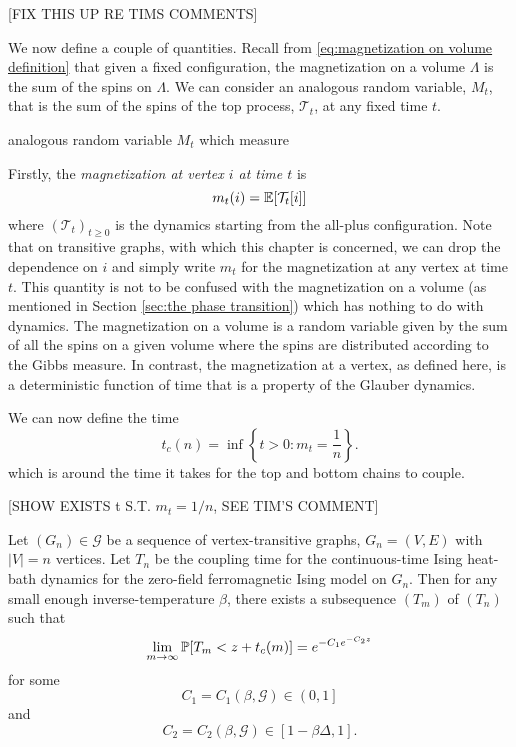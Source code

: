 [FIX THIS UP RE TIMS COMMENTS]

We now define a couple of quantities. Recall from \eqref{eq:magnetization on volume definition} that given a fixed configuration, the magnetization on a volume $\Lambda$ is the sum of the spins on $\Lambda$. We can consider an analogous random variable, $M_t$, that is the sum of the spins of the top process, $\mathcal{T}_t$, at any fixed time $t$. 

analogous random variable $M_t$ which measure

Firstly, the \emph{magnetization at vertex $i$ at time $t$} is
\begin{equation}
	 	m_t(i) = \mathbb{E}[\mathcal{T}_t[i]]
\end{equation} 
where $(\mathcal{T}_t)_{t \geq 0}$ is the dynamics starting from the all-plus configuration. Note that on transitive graphs, with which this chapter is concerned, we can drop the dependence on $i$ and simply write $m_t$ for the magnetization at any vertex at time $t$. This quantity is not to be confused with the magnetization on a volume (as mentioned in Section \ref{sec:the phase transition}) which has nothing to do with dynamics. The magnetization on a volume is a random variable given by the sum of all the spins on a given volume where the spins are distributed according to the Gibbs measure. In contrast, the magnetization at a vertex, as defined here, is a deterministic function of time that is a property of the Glauber dynamics.

We can now define the time
\begin{equation}
	\label{eq:definition t_c(n)}
	t_c(n) = \inf\left\{ t > 0 : m_t = \frac{1}{n}\right\}.
\end{equation}
which is around the time it takes for the top and bottom chains to couple.

[SHOW EXISTS t S.T. $m_t = 1/n$, SEE TIM'S COMMENT]

\begin{theorem}
\label{thm:Coupling Distribution on transitive graph}
	Let $(G_n) \in \mathscr{G}$ be a sequence of vertex-transitive graphs, $G_n = (V, E)$ with $|V| = n$ vertices. Let $T_n$ be the coupling time for the continuous-time Ising heat-bath dynamics for the zero-field ferromagnetic Ising model on $G_n$. Then for any small enough inverse-temperature $\beta$, there exists a subsequence $(T_m)$ of $(T_n)$ such that
	\begin{equation}
		\lim_{m \rightarrow \infty} \mathbb{P}[T_m < z + t_c(m)] = e^{-C_1e^{-C_2 z}}
	\end{equation}
	for some
	\begin{equation}
		C_1 = C_1(\beta, \mathscr{G}) \in \left(0,1\right]
	\end{equation}
	and
	\begin{equation}
		C_2 = C_2(\beta, \mathscr{G}) \in \left[1 - \beta \Delta, 1\right].
	\end{equation}

\end{theorem}

